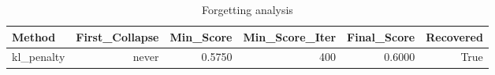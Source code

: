 \begin{table}[htbp]
\centering
\caption{Forgetting analysis}
\label{tab:forgetting}
\begin{tabular}{lrrrrr}
\toprule
\textbf{Method} & \textbf{First\_Collapse} & \textbf{Min\_Score} & \textbf{Min\_Score\_Iter} & \textbf{Final\_Score} & \textbf{Recovered} \\
\midrule
kl\_penalty & never & 0.5750 & 400 & 0.6000 & True \\
\bottomrule
\end{tabular}
\end{table}